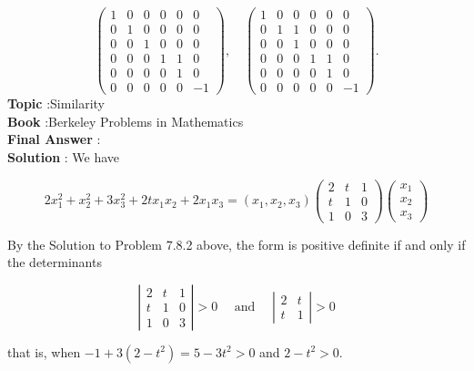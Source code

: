 \documentclass[10pt]{article}
\begin{document}
$$
\left(\begin{array}{rrrrrr}
1 & 0 & 0 & 0 & 0 & 0 \\
0 & 1 & 0 & 0 & 0 & 0 \\
0 & 0 & 1 & 0 & 0 & 0 \\
0 & 0 & 0 & 1 & 1 & 0 \\
0 & 0 & 0 & 0 & 1 & 0 \\
0 & 0 & 0 & 0 & 0 & -1
\end{array}\right), \quad\left(\begin{array}{rrrrrr}
1 & 0 & 0 & 0 & 0 & 0 \\
0 & 1 & 1 & 0 & 0 & 0 \\
0 & 0 & 1 & 0 & 0 & 0 \\
0 & 0 & 0 & 1 & 1 & 0 \\
0 & 0 & 0 & 0 & 1 & 0 \\
0 & 0 & 0 & 0 & 0 & -1
\end{array}\right) .
$$
\textbf{Topic} :Similarity \\
\textbf{Book} :Berkeley Problems in Mathematics\\
\textbf{Final Answer} :\\


\textbf{Solution} : We have

$$
2 x_{1}^{2}+x_{2}^{2}+3 x_{3}^{2}+2 t x_{1} x_{2}+2 x_{1} x_{3}=\left(x_{1}, x_{2}, x_{3}\right)\left(\begin{array}{lll}
2 & t & 1 \\
t & 1 & 0 \\
1 & 0 & 3
\end{array}\right)\left(\begin{array}{l}
x_{1} \\
x_{2} \\
x_{3}
\end{array}\right)
$$

By the Solution to Problem 7.8.2 above, the form is positive definite if and only if the determinants

$$
\left|\begin{array}{lll}
2 & t & 1 \\
t & 1 & 0 \\
1 & 0 & 3
\end{array}\right|>0 \quad \text { and } \quad\left|\begin{array}{ll}
2 & t \\
t & 1
\end{array}\right|>0
$$

that is, when $-1+3\left(2-t^{2}\right)=5-3 t^{2}>0$ and $2-t^{2}>0$.
\end{document}
